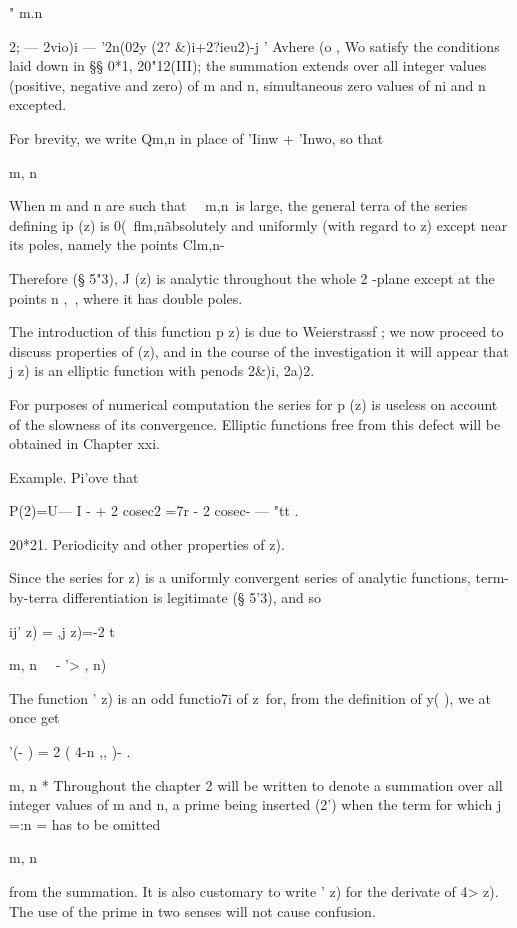  " m.n \ \ {2; — 2vio)i — '2n(02y (2? \&)i+2?ieu2)-j ' 
Avhere (o , Wo satisfy the conditions laid down in §§ 0*1, 20"12(III); the 
summation extends over all integer values (positive, negative and zero) of 
m and n, simultaneous zero values of ni and n excepted. 

For brevity, we write Qm,n in place of 'Iinw  + 'Inwo, so that 

m, n 

When m and n are such that \ \  m,n\ is large, the general terra of the 
series defining ip (z) is 0(\ flm,n\~%
absolutely and uniformly (with regard to z) except near its poles, namely 
the points Clm,n- 

Therefore (§ 5"3),  J (z) is analytic throughout the whole 2 -plane except 
at the points n ,\  , where it has double poles. 

The introduction of this function p z) is due to Weierstrassf ; we now 
proceed to discuss properties of   (z), and in the course of the investigation 
it will appear that  j z) is an elliptic function with penods 2\&)i, 2a)2. 

For purposes of numerical computation the series for p (z) is useless on account of the 
slowness of its convergence. Elliptic functions free from this defect will be obtained in 
Chapter xxi. 

Example. Pi'ove that 

P(2)=U— I - + 2 cosec2   =7r - 2 cosec- — "tt . 

20*21. Periodicity and other properties of   z). 

Since the series for    z) is a uniformly convergent series of analytic 
functions, term-by-terra differentiation is legitimate (§ 5'3), and so 

ij' z) =  ,j z)=-2 t   



  m, n \ \   - '> , n) 

The function  '  z) is an odd functio7i of z\ for, from the definition of 
 y( ), we at once get 

 '(- ) = 2   ( 4-n ,, )- . 

m, n 
* Throughout the chapter 2 will be written to denote a summation over all integer values 
of m and n, a prime being inserted (2') when the term for which j =:n = has to be omitted 

m, n 

from the summation. It is also customary to write  '  z) for the derivate of  4>  z). The use of 
the prime in two senses will not cause confusion. 

}
